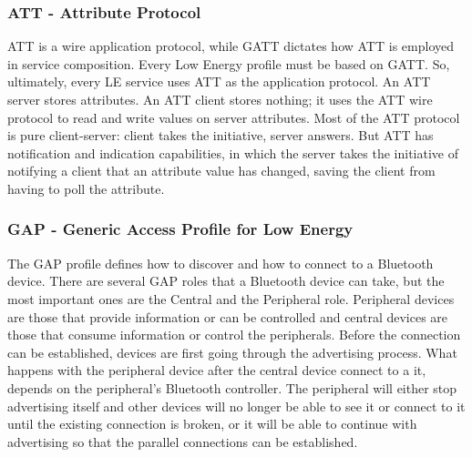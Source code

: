 \subsubsection{ATT - Attribute Protocol}
ATT is a wire application protocol, while GATT dictates how ATT is employed in service composition. Every Low Energy profile must be based on GATT. So, ultimately, every LE service uses ATT as the application protocol. An ATT server stores attributes. An ATT client stores nothing; it uses the ATT wire protocol to read and write values on server attributes. Most of the ATT protocol is pure client-server: client takes the initiative, server answers. But ATT has notification and indication capabilities, in which the server takes the initiative of notifying a client that an attribute value has changed, saving the client from having to poll the attribute.

\subsubsection{GAP - Generic Access Profile for Low Energy}
The GAP profile defines how to discover and how to connect to a Bluetooth device. There are several GAP roles that a Bluetooth device can take, but the most important ones are the Central and the Peripheral role. Peripheral devices are those that provide information or can be controlled and central devices are those that consume information or control the peripherals. Before the connection can be established, devices are first going through the advertising process. What happens with the peripheral device after the central device connect to a it, depends on the peripheral's Bluetooth controller. The peripheral will either stop advertising itself and other devices will no longer be able to see it or connect to it until the existing connection is broken, or it will be able to continue with advertising so that the parallel connections can be established.

